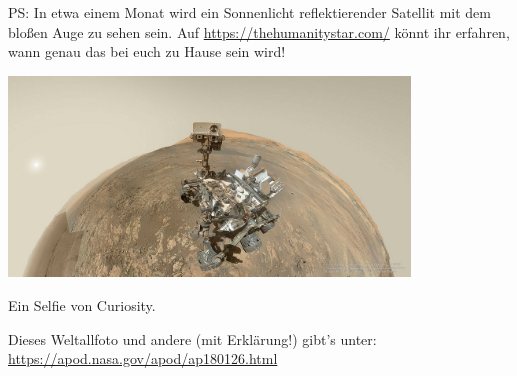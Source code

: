 \documentclass{anschreiben}
\begin{document}
PS: In etwa einem Monat wird ein Sonnenlicht reflektierender Satellit mit dem
bloßen Auge zu sehen sein. Auf \url{https://thehumanitystar.com/} könnt ihr
erfahren, wann genau das bei euch zu Hause sein wird!

\begin{center}
  \includegraphics[width=0.8\textwidth]{selfie}

  Ein Selfie von Curiosity.

  Dieses Weltallfoto und andere (mit Erklärung!) gibt's unter:
  \url{https://apod.nasa.gov/apod/ap180126.html}
\end{center}

\newpage
\fi\ifmore\repeat

\closein\quelle
\end{document}
